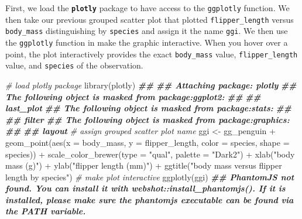 \documentclass[
]{book}
\newenvironment{Shaded}{\begin{snugshade}}{\end{snugshade}}
\newcommand{\AttributeTok}[1]{\textcolor[rgb]{0.77,0.63,0.00}{#1}}
\newcommand{\CommentTok}[1]{\textcolor[rgb]{0.56,0.35,0.01}{\textit{#1}}}
\newcommand{\DocumentationTok}[1]{\textcolor[rgb]{0.56,0.35,0.01}{\textbf{\textit{#1}}}}
\newcommand{\FunctionTok}[1]{\textcolor[rgb]{0.00,0.00,0.00}{#1}}
\newcommand{\NormalTok}[1]{#1}
\newcommand{\OtherTok}[1]{\textcolor[rgb]{0.56,0.35,0.01}{#1}}
\newcommand{\SpecialCharTok}[1]{\textcolor[rgb]{0.00,0.00,0.00}{#1}}
\newcommand{\StringTok}[1]{\textcolor[rgb]{0.31,0.60,0.02}{#1}}
\theoremstyle{definition}
\theoremstyle{definition}
\theoremstyle{definition}
\theoremstyle{definition}
\theoremstyle{remark}
\begin{document}
First, we load the \textbf{\texttt{plotly}} package to have access to the \texttt{ggplotly} function. We then take our previous grouped scatter plot that plotted \texttt{flipper\_length} versus \texttt{body\_mass} distinguishing by \texttt{species} and assign it the name \texttt{ggi}. We then use the \texttt{ggplotly} function in make the graphic interactive. When you hover over a point, the plot interactively provides the exact \texttt{body\_mass} value, \texttt{flipper\_length} value, and \texttt{species} of the observation.

\begin{Shaded}
\begin{Highlighting}[]
\CommentTok{\# load plotly package}
\FunctionTok{library}\NormalTok{(plotly)}
\DocumentationTok{\#\# }
\DocumentationTok{\#\# Attaching package: \textquotesingle{}plotly\textquotesingle{}}
\DocumentationTok{\#\# The following object is masked from \textquotesingle{}package:ggplot2\textquotesingle{}:}
\DocumentationTok{\#\# }
\DocumentationTok{\#\#     last\_plot}
\DocumentationTok{\#\# The following object is masked from \textquotesingle{}package:stats\textquotesingle{}:}
\DocumentationTok{\#\# }
\DocumentationTok{\#\#     filter}
\DocumentationTok{\#\# The following object is masked from \textquotesingle{}package:graphics\textquotesingle{}:}
\DocumentationTok{\#\# }
\DocumentationTok{\#\#     layout}
\CommentTok{\# assign grouped scatter plot name}
\NormalTok{ggi }\OtherTok{\textless{}{-}}
\NormalTok{  gg\_penguin }\SpecialCharTok{+}
  \FunctionTok{geom\_point}\NormalTok{(}\FunctionTok{aes}\NormalTok{(}\AttributeTok{x =}\NormalTok{ body\_mass, }\AttributeTok{y =}\NormalTok{ flipper\_length,}
                 \AttributeTok{color =}\NormalTok{ species, }\AttributeTok{shape =}\NormalTok{ species)) }\SpecialCharTok{+}
  \FunctionTok{scale\_color\_brewer}\NormalTok{(}\AttributeTok{type =} \StringTok{"qual"}\NormalTok{, }\AttributeTok{palette =} \StringTok{"Dark2"}\NormalTok{) }\SpecialCharTok{+}
  \FunctionTok{xlab}\NormalTok{(}\StringTok{"body mass (g)"}\NormalTok{) }\SpecialCharTok{+} \FunctionTok{ylab}\NormalTok{(}\StringTok{"flipper length (mm)"}\NormalTok{) }\SpecialCharTok{+}
  \FunctionTok{ggtitle}\NormalTok{(}\StringTok{"body mass versus flipper length by species"}\NormalTok{)}
\CommentTok{\# make plot interactive}
\FunctionTok{ggplotly}\NormalTok{(ggi)}
\DocumentationTok{\#\# PhantomJS not found. You can install it with webshot::install\_phantomjs(). If it is installed, please make sure the phantomjs executable can be found via the PATH variable.}
\end{Highlighting}
\end{Shaded}
\end{document}
